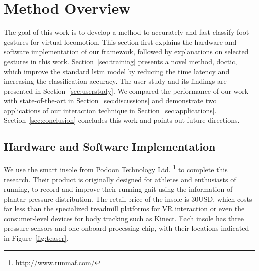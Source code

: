\documentclass[review]{vgtc}                 %
\begin{document}
\section{Method Overview}
The goal of this work is to develop a method to accurately and fast classify foot gestures for virtual locomotion.
This section first explains the hardware and software implementation of our framework, followed by explanations on selected gestures in this work.
Section~\ref{sec:training} presents a novel method, \acs{doctic}, which improve the standard \acs{lstm} model by reducing the time latency and increasing the classification accuracy.
The user study and its findings are presented in Section~\ref{sec:userstudy}.
We compared the performance of our work with state-of-the-art in Section~\ref{sec:discussions} and demonstrate two applications of our interaction technique in Section~\ref{sec:applications}.
Section~\ref{sec:conclusion} concludes this work and points out future directions.

\subsection{Hardware and Software Implementation}
We use the smart insole from Podoon Technology Ltd. \footnote{http://www.runmaf.com/} to complete this research. 
Their product is originally designed for athletes and enthusiasts of running, to record and improve their running gait using the information of plantar pressure distribution. 
The retail price of the insole is 30USD, which costs far less than the specialized treadmill platforms for VR interaction or even the consumer-level devices for body tracking such as Kinect.
Each insole has three pressure sensors and one onboard processing chip, with their locations indicated in Figure~\ref{fig:teaser}.
%
\end{document}
